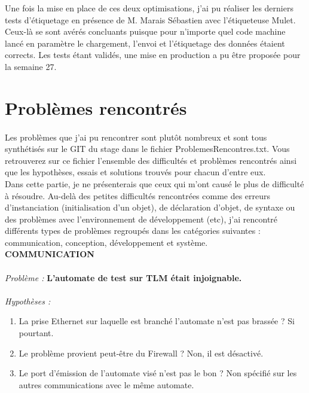 \documentclass[a4paper,12pt]{extarticle}
\begin{document}
Une fois la mise en place de ces deux optimisations, j’ai pu réaliser les derniers tests d’étiquetage en présence de M. Marais Sébastien avec l’étiqueteuse Mulet. Ceux-là se sont avérés concluants puisque pour n’importe quel code machine lancé en paramètre le chargement, l’envoi et l’étiquetage des données étaient corrects. Les tests étant validés, une mise en production a pu être proposée pour la semaine 27.\\
	
	\clearpage
	
	\section{Problèmes rencontrés}
		\paragraph{}
	
	Les problèmes que j’ai pu rencontrer sont plutôt nombreux et sont tous synthétisés sur le GIT du stage dans le fichier ProblemesRencontres.txt. Vous retrouverez sur ce fichier l’ensemble des difficultés et problèmes rencontrés ainsi que les hypothèses, essais et solutions trouvés pour chacun d’entre eux.\\
Dans cette partie, je ne présenterais que ceux qui m’ont causé le plus de difficulté à résoudre.
Au-delà des petites difficultés rencontrées comme des erreurs d’instanciation (initialisation d’un objet), de déclaration d’objet, de syntaxe ou des problèmes avec l’environnement de développement (etc), j’ai rencontré différents types de problèmes regroupés dans les catégories suivantes : communication, conception, développement et système.\\

\textbf{COMMUNICATION}\\
\\
\emph{Problème :} \textbf{L’automate de test sur TLM était injoignable.}\\
\\
\emph{Hypothèses :}

\begin{enumerate}[-]
    \item La prise Ethernet sur laquelle est branché l’automate n’est pas brassée ? Si pourtant.
    \item Le problème provient peut-être du Firewall ? Non, il est désactivé.
    \item Le port d’émission de l’automate visé n’est pas le bon ? Non spécifié sur les autres communications avec le même automate.
\end{enumerate}
\end{document}
